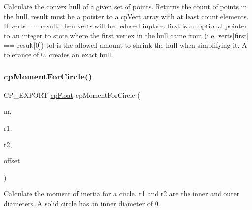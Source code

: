 Calculate the convex hull of a given set of points. Returns the count of points in the hull. {\ttfamily result} must be a pointer to a {\ttfamily \mbox{\hyperlink{structcp_vect}{cp\+Vect}}} array with at least {\ttfamily count} elements. If {\ttfamily verts} == {\ttfamily result}, then {\ttfamily verts} will be reduced inplace. {\ttfamily first} is an optional pointer to an integer to store where the first vertex in the hull came from (i.\+e. verts\mbox{[}first\mbox{]} == result\mbox{[}0\mbox{]}) {\ttfamily tol} is the allowed amount to shrink the hull when simplifying it. A tolerance of 0. creates an exact hull. \mbox{\label{group__misc_gafa2103fb2fd788fded1131e53f00681a}} 
\subsubsection{\texorpdfstring{cp\+Moment\+For\+Circle()}{cpMomentForCircle()}}
{\footnotesize\ttfamily C\+P\+\_\+\+E\+X\+P\+O\+RT \mbox{\hyperlink{group__basic_types_gac1ed65573e035bf892505768c852d8d3}{cp\+Float}} cp\+Moment\+For\+Circle (\begin{DoxyParamCaption}\item[{\mbox{\hyperlink{group__basic_types_gac1ed65573e035bf892505768c852d8d3}{cp\+Float}}}]{m,  }\item[{\mbox{\hyperlink{group__basic_types_gac1ed65573e035bf892505768c852d8d3}{cp\+Float}}}]{r1,  }\item[{\mbox{\hyperlink{group__basic_types_gac1ed65573e035bf892505768c852d8d3}{cp\+Float}}}]{r2,  }\item[{\mbox{\hyperlink{structcp_vect}{cp\+Vect}}}]{offset }\end{DoxyParamCaption})}

Calculate the moment of inertia for a circle. {\ttfamily r1} and {\ttfamily r2} are the inner and outer diameters. A solid circle has an inner diameter of 0. \mbox{\label{group__misc_ga9548fe7830d426bde625d39d4687e6be}} 
